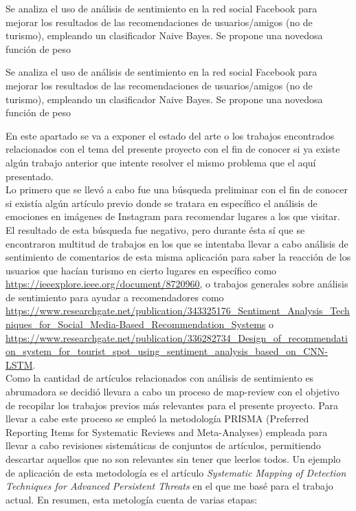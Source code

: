 Se analiza el uso de análisis de sentimiento en la red social Facebook para mejorar los resultados de las recomendaciones de usuarios/amigos (no de turismo), empleando un clasificador Naive Bayes. Se propone una novedosa función de peso

Se analiza el uso de análisis de sentimiento en la red social Facebook para mejorar los resultados de las recomendaciones de usuarios/amigos (no de turismo), empleando un clasificador Naive Bayes. Se propone una novedosa función de peso




En este apartado se va a exponer el estado del arte o los trabajos encontrados relacionados con el tema del presente proyecto con el fin de conocer si ya existe algún trabajo anterior que intente resolver el mismo problema que el aquí presentado.\\

Lo primero que se llevó a cabo fue una búsqueda preliminar con el fin de conocer si existía algún artículo previo donde se tratara en específico el análisis de emociones en imágenes de Instagram para recomendar lugares a los que visitar. El resultado de esta búsqueda fue negativo, pero durante ésta sí que se encontraron multitud de trabajos en los que se intentaba llevar a cabo análisis de sentimiento de comentarios de esta misma aplicación para saber la reacción de los usuarios que hacían turismo en cierto lugares en específico como \url{https://ieeexplore.ieee.org/document/8720960}, o trabajos generales sobre análisis de sentimiento para ayudar a recomendadores como \url{https://www.researchgate.net/publication/343325176_Sentiment_Analysis_Techniques_for_Social_Media-Based_Recommendation_Systems} o \url{https://www.researchgate.net/publication/336282734_Design_of_recommendation_system_for_tourist_spot_using_sentiment_analysis_based_on_CNN-LSTM}.\\

Como la cantidad de artículos relacionados con análisis de sentimiento es abrumadora se decidió llevara a cabo un proceso de map-review con el objetivo de recopilar los trabajos previos más relevantes para el presente proyecto. Para llevar a cabe este proceso se empleó la metodología PRISMA (Preferred Reporting Items for Systematic Reviews and Meta-Analyses) empleada para llevar a cabo revisiones sistemáticas de conjuntos de artículos, permitiendo descartar aquellos que no son relevantes sin tener que leerlos todos. Un ejemplo de aplicación de esta metodología es el artículo \textit{Systematic Mapping of Detection Techniques for Advanced Persistent Threats} en el que me basé para el trabajo actual. En resumen, esta metología cuenta de varias etapas:

